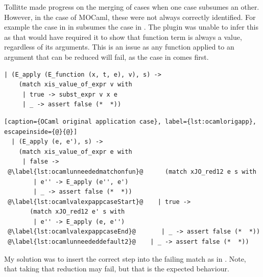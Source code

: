 \documentclass[12pt,twoside,notitlepage]{report}
\theoremstyle{plain}%
\theoremstyle{definition}
\theoremstyle{remark}
\begin{document}
Tollitte\cite{tollitte2012producing} made progress on the merging of cases when one case subsumes an other. However, in the case of MOCaml, these were not always correctly identified. For example the case in  in  subsumes the case in . The plugin was unable to infer this as that would have required it to show that function term is always a value, regardless of its arguments. This is an issue as any function applied to an argument that can be reduced will fail, as the case in  comes first.


\vspace{3mm}

\begin{minipage}{\linewidth}

\begin{lstlisting}[caption={OCaml original substitution case}, label={lst:ocamlorigsub}]
  | (E_apply (E_function (x, t, e), v), s) ->
    (match xis_value_of_expr v with
     | true -> subst_expr v x e
     | _ -> assert false (*  *))
\end{lstlisting}

\end{minipage}

\begin{minipage}{\linewidth}

\begin{lstlisting}[caption={OCaml original application case}, label={lst:ocamlorigapp}, escapeinside={@}{@}]
  | (E_apply (e, e'), s) ->
    (match xis_value_of_expr e with
     | false ->
 @\label{lst:ocamlunneededmatchonfun}@      (match xJO_red12 e s with
        | e'' -> E_apply (e'', e')
        | _ -> assert false (*  *))
 @\label{lst:ocamlvalexpappcaseStart}@    | true ->
       (match xJO_red12 e' s with
        | e'' -> E_apply (e, e'')
 @\label{lst:ocamlvalexpappcaseEnd}@       | _ -> assert false (*  *))
 @\label{lst:ocamlunneededdefault2}@    | _ -> assert false (*  *))
\end{lstlisting}

\end{minipage}
My solution was to insert the correct step into the failing match as in . Note, that taking that reduction may fail, but that is the expected behaviour.
\end{document}
